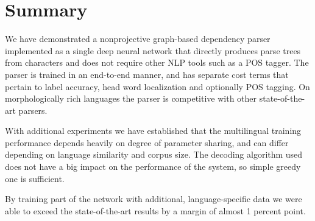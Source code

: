 \chapter{Summary}
We have demonstrated a nonprojective graph-based dependency parser implemented as a single deep
neural network that directly produces parse trees from characters and does not require
other NLP tools such as a POS tagger. The parser is trained in an end-to-end manner,
and has separate cost terms that pertain to label accuracy,
head word localization and optionally POS tagging. On
morphologically rich languages the parser is competitive
with other state-of-the-art parsers.

With additional experiments we have established that the multilingual training
performance depends heavily on degree of parameter sharing, and can differ
depending on language similarity and corpus size. The decoding
algorithm used does not have a big impact on the performance of the system,
so simple greedy one is sufficient.

By training part of the network with additional, language-specific data we were
able to exceed the state-of-the-art results by a margin of almost 1 percent point.
